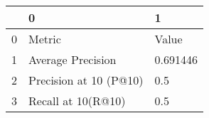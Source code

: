 \begin{tabular}{lll}
\toprule
{} &                       0 &         1 \\
\midrule
0 &                  Metric &     Value \\
1 &       Average Precision &  0.691446 \\
2 &  Precision at 10 (P@10) &       0.5 \\
3 &      Recall at 10(R@10) &       0.5 \\
\bottomrule
\end{tabular}
